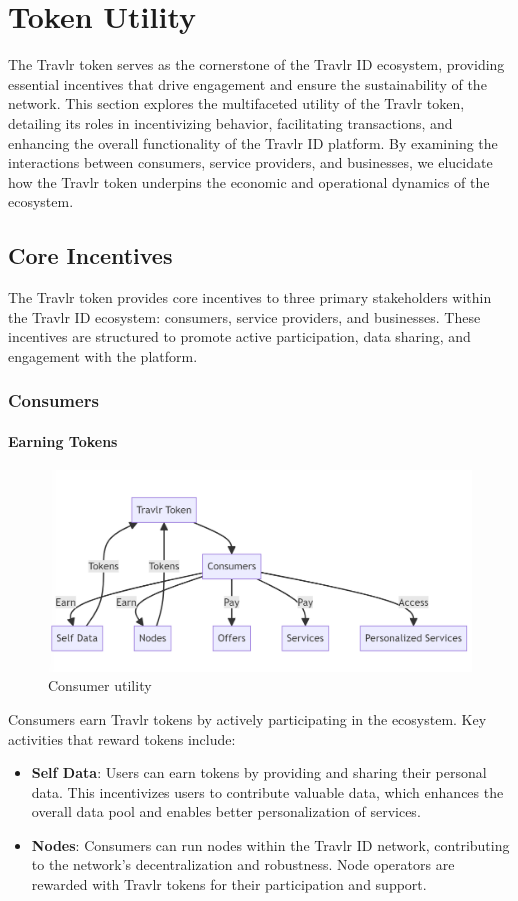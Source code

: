 \documentclass{article}
\begin{document}
\newpage

\section{Token Utility}

The Travlr token serves as the cornerstone of the Travlr ID ecosystem, providing essential incentives that drive engagement and ensure the sustainability of the network. This section explores the multifaceted utility of the Travlr token, detailing its roles in incentivizing behavior, facilitating transactions, and enhancing the overall functionality of the Travlr ID platform. By examining the interactions between consumers, service providers, and businesses, we elucidate how the Travlr token underpins the economic and operational dynamics of the ecosystem.

\subsection{Core Incentives}

The Travlr token provides core incentives to three primary stakeholders within the Travlr ID ecosystem: consumers, service providers, and businesses. These incentives are structured to promote active participation, data sharing, and engagement with the platform.

\subsubsection{Consumers}

\paragraph{Earning Tokens}
\begin{figure}[h]
    \centering
    \includegraphics[width=0.7\linewidth]{travlr_diagram_2.png}
    \caption{Consumer utility}
    \label{fig:enter-label}
\end{figure}
Consumers earn Travlr tokens by actively participating in the ecosystem. Key activities that reward tokens include:
\begin{itemize}
    \item \textbf{Self Data}: Users can earn tokens by providing and sharing their personal data. This incentivizes users to contribute valuable data, which enhances the overall data pool and enables better personalization of services.
    \item \textbf{Nodes}: Consumers can run nodes within the Travlr ID network, contributing to the network's decentralization and robustness. Node operators are rewarded with Travlr tokens for their participation and support.
\end{itemize}
\end{document}
